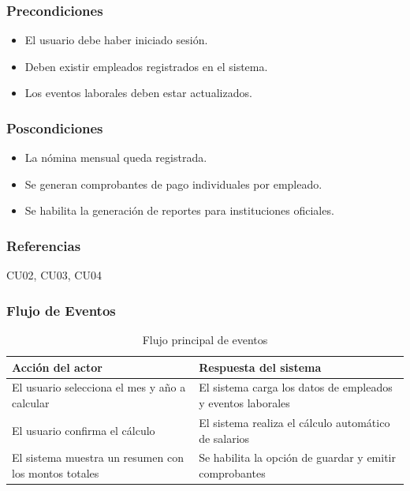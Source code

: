 \subsubsection*{Precondiciones}
\begin{itemize}
	\item El usuario debe haber iniciado sesión.
	\item Deben existir empleados registrados en el sistema.
	\item Los eventos laborales deben estar actualizados.
\end{itemize}

\subsubsection*{Poscondiciones}
\begin{itemize}
	\item La nómina mensual queda registrada.
	\item Se generan comprobantes de pago individuales por empleado.
	\item Se habilita la generación de reportes para instituciones oficiales.
\end{itemize}

\subsubsection*{Referencias}
CU02, CU03, CU04

\clearpage

\subsubsection*{Flujo de Eventos}

\begin{table}[h]
	\centering
	\caption{Flujo principal de eventos}
	\begin{tabular}{|p{7cm}|p{7cm}|}
		\hline
		\textbf{Acción del actor}                            & \textbf{Respuesta del sistema}                              \\ \hline
		El usuario selecciona el mes y año a calcular        & El sistema carga los datos de empleados y eventos laborales \\ \hline
		El usuario confirma el cálculo                       & El sistema realiza el cálculo automático de salarios        \\ \hline
		El sistema muestra un resumen con los montos totales & Se habilita la opción de guardar y emitir comprobantes      \\ \hline
	\end{tabular}
\end{table}

